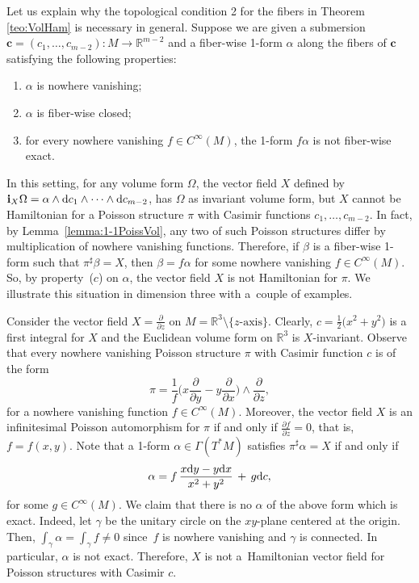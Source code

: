 \documentclass[10pt,a4paper]{amsart}
\newcommand{\R}[1]{\mathbb{R}^{#1}}
\newcommand{\dd}{{\rm d}}
\newcommand{\ii}{\mathbf{i}}
\numberwithin{equation}{section}
\begin{document}
Let us explain why the topological condition 2 for the fibers in Theorem \ref{teo:VolHam} is necessary in general. Suppose we are given a submersion $\boldsymbol{c}=(c_1, \dots, c_{m-2})\colon M \to \R{m-2}$ and a fiber-wise 1-form $\alpha$ along the fibers of $\boldsymbol{c}$ satisfying the following properties:
 \begin{enumerate}\itemsep=0pt
 \item[$(a)$] $\alpha$ is nowhere vanishing;
 \item[$(b)$] $\alpha$ is fiber-wise closed;
 \item[$(c)$] for every nowhere vanishing $f\in C^{\infty}(M)$, the 1-form $f\alpha$ is not fiber-wise exact.
 \end{enumerate}
In this setting, for any volume form $\Omega$, the vector field $X$ defined by $\ii_{X}\Omega = \alpha \wedge \dd c_{1}\wedge \dots \wedge \dd c_{m-2}$, has $\Omega$ as invariant volume form, but $X$ cannot be Hamiltonian for a Poisson structure $\pi$ with Casimir functions $c_1, \dots, c_{m-2}$. In fact, by Lemma~\ref{lemma:1-1PoissVol}, any two of such Poisson structures differ by multiplication of nowhere vanishing functions. Therefore, if $\beta$ is a fiber-wise 1-form such that $\pi^{\sharp}\beta = X$, then $\beta = f\alpha$ for some nowhere vanishing $f \in C^{\infty}(M)$. So, by property~($c$) on $\alpha$, the vector field $X$ is not Hamiltonian for $\pi$. We illustrate this situation in dimension three with a~couple of examples.

\begin{Example}\label{exm:37}
Consider the vector field $X = \tfrac{\partial}{\partial z}$ on $M = \R{3} \setminus\{z\text{-axis}\}$. Clearly, $c= \frac{1}{2}\big(x^2 + y^2\big)$ is a first integral for $X$ and the Euclidean volume form on $\R{3}$ is $X$-invariant. Observe that every nowhere vanishing Poisson structure $\pi$ with Casimir function $c$ is of the form
 \begin{equation*}
 \pi = \frac{1}{f}\bigg(x\frac{\partial}{\partial y}- y\frac{\partial}{\partial x}\bigg)\wedge\frac{\partial}{\partial z},
 \end{equation*}
for a nowhere vanishing function $f \in C^{\infty}(M)$. Moreover, the vector field $X$ is an infinitesimal Poisson automorphism for $\pi$ if and only if $\frac{\partial f}{\partial z} = 0$, that is, $f = f(x,y)$. Note that a 1-form $\alpha \in \Gamma(T^{*}M)$ satisfies $\pi^{\sharp}\alpha = X$ if and only if
 \begin{equation*}
 \alpha = f\,\frac{x\dd y - y\dd x}{x^2+y^2} \,+\, g\dd c,
 \end{equation*}
for some $g \in C^{\infty}(M)$. We claim that there is no $\alpha$ of the above form which is exact. Indeed, let $\gamma$ be the unitary circle on the $xy$-plane centered at the origin. Then, $\int_{\gamma}\alpha = \int_{\gamma}f \neq 0$ since~$f$ is nowhere vanishing and $\gamma$ is connected. In particular, $\alpha$ is not exact. Therefore, $X$ is not a~Hamiltonian vector field for Poisson structures with Casimir $c$.
\end{Example}
\end{document}
